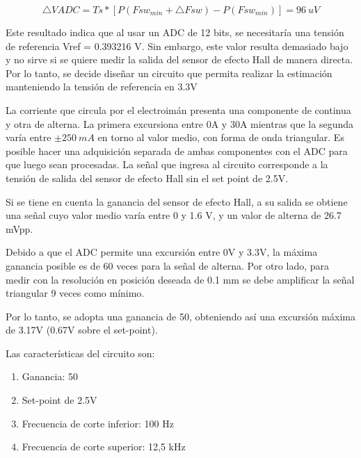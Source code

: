 \documentclass{article} %
\begin{document}
\noindent 
\[\triangle VADC=Ts*[P({Fsw}_{min}+\triangle Fsw)-P({Fsw}_{min})]=96\ uV\] 


\noindent Este resultado indica que al usar un ADC de 12 bits, se necesitar\'{i}a una tensi\'{o}n de referencia Vref = 0.393216 V. Sin embargo, este valor resulta demasiado bajo y no sirve si se quiere medir la salida del sensor de efecto Hall de manera directa. Por lo tanto, se decide dise\~{n}ar un circuito que permita realizar la estimaci\'{o}n manteniendo la tensi\'{o}n de referencia en 3.3V

\noindent 

\noindent La corriente que circula por el electroim\'{a}n presenta una componente de continua y otra de alterna. La primera excursiona entre 0A y 30A mientras que la segunda var\'{i}a entre $\pm 250\ mA$ en torno al valor medio, con forma de onda triangular. Es posible hacer una adquisici\'{o}n separada de ambas componentes con el ADC para que luego sean procesadas. La se\~{n}al que ingresa al circuito corresponde a la tensi\'{o}n de salida del sensor de efecto Hall sin el set point de 2.5V.

\noindent 

\noindent Si se tiene en cuenta la ganancia del sensor de efecto Hall, a su salida se obtiene una se\~{n}al cuyo valor medio var\'{i}a entre 0 y 1.6 V, y un valor de alterna de 26.7 mVpp.

\noindent 

\noindent Debido a que el ADC permite una excursi\'{o}n entre 0V y 3.3V, la m\'{a}xima ganancia posible es de 60 veces para la se\~{n}al de alterna. Por otro lado, para medir con la resoluci\'{o}n en posici\'{o}n deseada de 0.1 mm se debe amplificar la se\~{n}al triangular 9 veces como m\'{i}nimo.

\noindent  

\noindent Por lo tanto, se adopta una ganancia de 50, obteniendo as\'{i} una excursi\'{o}n m\'{a}xima de 3.17V (0.67V sobre el set-point).

\noindent 

\noindent Las caracter\'{i}sticas del circuito son:

\begin{enumerate}
\item  Ganancia: 50

\item  Set-point de 2.5V 

\item  Frecuencia de corte inferior: 100 Hz

\item  Frecuencia de corte superior: 12,5 kHz 
\end{enumerate}
\end{document}
